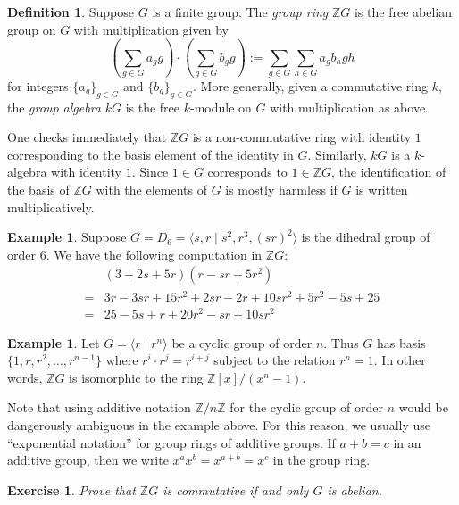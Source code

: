 \documentclass[12pt]{article}
\theoremstyle{plain}
\newtheorem{exercise}[theorem]{Exercise}
\theoremstyle{definition}
\newtheorem{definition}[theorem]{Definition}
\newtheorem{example}[theorem]{Example}
\theoremstyle{remark}
\numberwithin{equation}{section}
\begin{document}
\begin{definition}
Suppose $G$ is a finite group.
The \emph{group ring} $\mathbb{Z}G$ is the free abelian group
on $G$ with multiplication given by
\[
\left( \sum_{g \in G} a_g g \right) \cdot
\left( \sum_{g \in G} b_g g \right)
:= \sum_{g \in G} \sum_{h \in G} a_gb_h gh
\]
for integers $\{a_g\}_{g\in G}$ and $\{b_g\}_{g\in G}$.
More generally, given a commutative ring $k$,
the \emph{group algebra} $kG$ is the free $k$-module on $G$
with multiplication as above.
\end{definition}

One checks immediately that $\mathbb{Z}G$ is a non-commutative ring with
identity $1$ corresponding to the basis element of the identity in $G$.
Similarly, $kG$ is a $k$-algebra with identity $1$.
Since $1 \in G$ corresponds to $1 \in \mathbb{Z}G$,
the identification of the basis of $\mathbb{Z}G$ with the elements of
$G$ is mostly harmless if $G$ is written multiplicatively.

\begin{example}
Suppose $G=D_6=\langle s,r \mid s^2, r^3, (sr)^2 \rangle$
is the dihedral group of order $6$.
We have the following computation in $\mathbb{Z}G$:
\begin{align*}
&(3 + 2s + 5r)(r-sr + 5r^2)\\
=& 3r -3sr +15r^2 + 2sr -2r+10sr^2 +5r^2 -5s+25\\
=& 25 -5s + r + 20r^2 -sr +10sr^2
\end{align*}
\end{example}

\begin{example}
Let $G = \langle r \mid r^n \rangle$ be a cyclic group of order $n$.
Thus $G$ has basis $\{1,r,r^2,\ldots, r^{n-1} \}$
where $r^i\cdot r^j=r^{i+j}$ subject to the relation $r^n=1$.
In other words, $\mathbb{Z}G$ is isomorphic to the ring
$\mathbb{Z}[x]/(x^n-1)$.
\end{example}

Note that using additive notation $\mathbb{Z}/n\mathbb{Z}$
for the cyclic group of order $n$ would be dangerously
ambiguous in the example above.
For this reason, we usually use ``exponential notation''
for group rings of additive groups.
If $a+b=c$ in an additive group, then
we write $x^ax^b=x^{a+b}=x^c$ in the group ring.

\begin{exercise}
Prove that $\mathbb{Z}G$ is commutative if and only $G$ is abelian.
\end{exercise}
\end{document}
